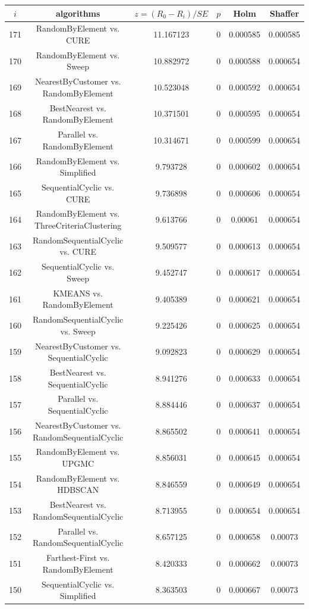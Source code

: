\documentclass[a4paper,10pt]{article}
\begin{document}
\begin{landscape}
\begin{table}[!htp]
\centering\scriptsize
\begin{tabular}{cccccc}
$i$&algorithms&$z=(R_0 - R_i)/SE$&$p$&Holm&Shaffer\\
\hline171&RandomByElement vs. CURE&11.167123&0&0.000585&0.000585\\
170&RandomByElement vs. Sweep&10.882972&0&0.000588&0.000654\\
169&NearestByCustomer vs. RandomByElement&10.523048&0&0.000592&0.000654\\
168&BestNearest vs. RandomByElement&10.371501&0&0.000595&0.000654\\
167&Parallel vs. RandomByElement&10.314671&0&0.000599&0.000654\\
166&RandomByElement vs. Simplified&9.793728&0&0.000602&0.000654\\
165&SequentialCyclic vs. CURE&9.736898&0&0.000606&0.000654\\
164&RandomByElement vs. ThreeCriteriaClustering&9.613766&0&0.00061&0.000654\\
163&RandomSequentialCyclic vs. CURE&9.509577&0&0.000613&0.000654\\
162&SequentialCyclic vs. Sweep&9.452747&0&0.000617&0.000654\\
161&KMEANS vs. RandomByElement&9.405389&0&0.000621&0.000654\\
160&RandomSequentialCyclic vs. Sweep&9.225426&0&0.000625&0.000654\\
159&NearestByCustomer vs. SequentialCyclic&9.092823&0&0.000629&0.000654\\
158&BestNearest vs. SequentialCyclic&8.941276&0&0.000633&0.000654\\
157&Parallel vs. SequentialCyclic&8.884446&0&0.000637&0.000654\\
156&NearestByCustomer vs. RandomSequentialCyclic&8.865502&0&0.000641&0.000654\\
155&RandomByElement vs. UPGMC&8.856031&0&0.000645&0.000654\\
154&RandomByElement vs. HDBSCAN&8.846559&0&0.000649&0.000654\\
153&BestNearest vs. RandomSequentialCyclic&8.713955&0&0.000654&0.000654\\
152&Parallel vs. RandomSequentialCyclic&8.657125&0&0.000658&0.00073\\
151&Farthest-First vs. RandomByElement&8.420333&0&0.000662&0.00073\\
150&SequentialCyclic vs. Simplified&8.363503&0&0.000667&0.00073\\

\end{tabular}
\end{table}
\end{landscape}
\end{document}
